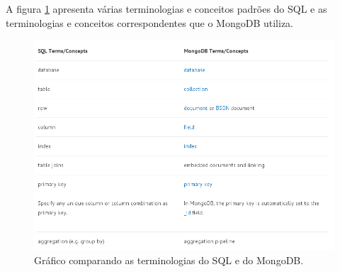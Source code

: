 A figura \ref{fig:Gráfico comparando as terminologias do SQL e do MongoDB} \cite{MongoDbSQL} apresenta várias terminologias e conceitos padrões do SQL e as terminologias e conceitos correspondentes que o MongoDB utiliza.

\begin{figure}[!ht]
\centering
\includegraphics[scale=0.7]{images/comp_mongo_sql.png}
\caption{Gráfico comparando as terminologias do SQL e do MongoDB.}
\label{fig:Gráfico comparando as terminologias do SQL e do MongoDB}
\end{figure}

